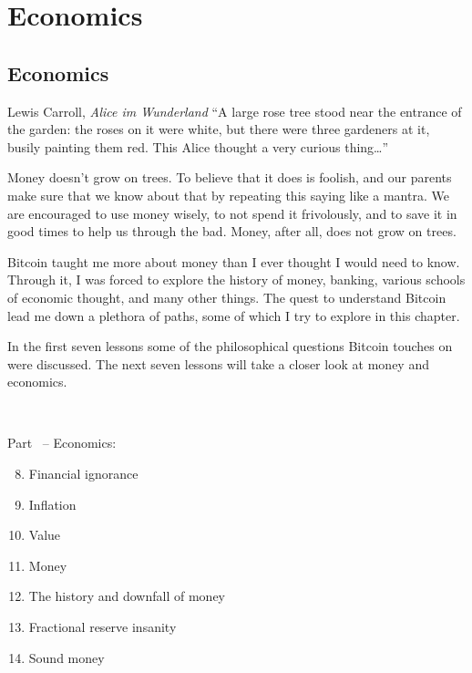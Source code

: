 \part{Economics}
\label{ch:economics}
\chapter*{Economics}

\begin{chapquote}{Lewis Carroll, \textit{Alice im Wunderland}}
\enquote{A large rose tree stood near the entrance of the garden: the roses on it were
white, but there were three gardeners at it, busily painting them red. This
Alice thought a very curious thing\ldots}
\end{chapquote}

Money doesn’t grow on trees. To believe that it does is foolish, and our
parents make sure that we know about that by repeating this saying like a
mantra. We are encouraged to use money wisely, to not spend it frivolously,
and to save it in good times to help us through the bad. Money, after all,
does not grow on trees.

Bitcoin taught me more about money than I ever thought I would need to know.
Through it, I was forced to explore the history of money, banking, various
schools of economic thought, and many other things. The quest to understand
Bitcoin lead me down a plethora of paths, some of which I try to explore in
this chapter.

In the first seven lessons some of the philosophical questions Bitcoin touches
on were discussed. The next seven lessons will take a closer look at money and
economics.

~

\begin{samepage}
Part~\ref{ch:economics} -- Economics:

\begin{enumerate}
  \setcounter{enumi}{7}
  \item Financial ignorance
  \item Inflation
  \item Value
  \item Money
  \item The history and downfall of money
  \item Fractional reserve insanity
  \item Sound money
\end{enumerate}
\end{samepage}

